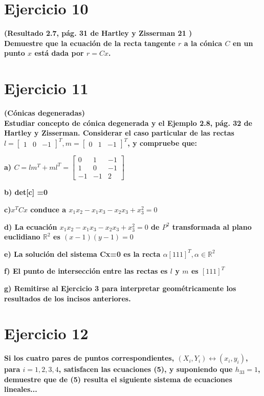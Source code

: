 \documentclass[12pt]{article}
\begin{document}
\section{Ejercicio 10}
\textbf{
(Resultado 2.7, pág. 31 de Hartley y Zisserman 21 )\\
 Demuestre que la ecuación de la recta tangente $r$ a la cónica $C$ en un punto $x$ está dada por $r=Cx$.
}
\\



\section{Ejercicio 11}

\textbf{(Cónicas degeneradas)\\
Estudiar concepto de cónica degenerada y el Ejemplo 2.8, pág. 32 de Hartley y Zisserman. Considerar el caso particular de las rectas 
$l= \begin{bmatrix} 1 & 0 & -1\end{bmatrix}^{T}, m= \begin{bmatrix} 0 & 1 & -1\end{bmatrix}^{T} $, y compruebe que:
}

\textbf{a) $C=lm^{T} + ml^{T} = \begin{bmatrix} 0 &1 & -1\\1 &0&-1\\-1&-1&2 \end{bmatrix}$}

\textbf{b) det[c] =0} 


\textbf{c)$ x^{T}Cx $ conduce a $ x_{1}x_{2}-x_{1}x_{3}-x_{2}x_{3}+x_{3}^{2}=0$ }

\textbf{d) La ecuación $ x_{1}x_{2}-x_{1}x_{3}-x_{2}x_{3}+x_{3}^{2}=0$ de $P^{2}$ transformada al plano euclidiano $\mathbb{R}^{2}$ es $(x-1)(y-1)=0$ }

\textbf{e) La solución del sistema Cx=0 es la recta $\alpha[1 1 1]^{T}, \alpha \in \mathbb{R}^{2}$}

\textbf{f) El punto de intersección entre las rectas es $l$ y $m$ es $[1 1 1]^{T}$}

\textbf{g) Remitirse al Ejercicio 3 para interpretar geométricamente los resultados
de los incisos anteriores.}

\section{Ejercicio 12}
\textbf{
Si los cuatro pares de puntos correspondientes, $(X_{i}, Y_{i}) \leftrightarrow (x_{i}, y_{i})$, para $i=1, 2, 3, 4$, satisfacen las ecuaciones (5), y suponiendo que $h_{33} =1$, demuestre que de (5) resulta el siguiente sistema de ecuaciones lineales...}
\end{document}
